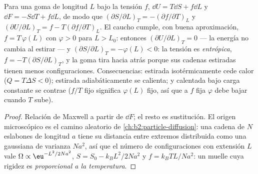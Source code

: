 \begin{proposition}\label{prop:b2:thermodynamic-potentials:rubber}
Para una goma de longitud $L$ bajo la tensión $f$, $\dd U = T\dd S + f\dd L$
y $\dd F = -S\dd T + f\dd L$, de modo que $(\partial S/\partial L)_T =
-(\partial f/\partial T)_L$ y $(\partial U/\partial L)_T = f - T(\partial f/
\partial T)_L$. El caucho cumple, con buena aproximación, $f = T\,\varphi(L)$
con $\varphi > 0$ para $L > L_0$: entonces $(\partial U/\partial L)_T = 0$ --- la
energía no cambia al estirar --- y $(\partial S/\partial L)_T =
-\varphi(L) < 0$: la tensión es \emph{entrópica}, $f = -T(\partial S/\partial
L)_T$, y la goma tira hacia atrás porque sus cadenas estiradas tienen menos
configuraciones. Consecuencias: estirada isotérmicamente cede calor
($Q = T\Delta S < 0$); estirada adiabáticamente se calienta; y calentada bajo
carga constante se contrae ($f/T$ fijo significa $\varphi(L)$ fijo, así que a
$f$ fija $\varphi$ debe bajar cuando $T$ sube).
\end{proposition}

\begin{proof}
Relación de Maxwell a partir de $\dd F$; el resto es sustitución. El
origen microscópico es el camino aleatorio de \cref{ch:b2:particle-diffusion}:
una cadena de $N$ eslabones de longitud $a$ tiene su distancia entre extremos
distribuida como una gaussiana de varianza $Na^2$, así que el número de
configuraciones con extensión $L$ vale $\Omega \propto \eu^{-L^2/2Na^2}$, $S = S_0 -
k_BL^2/2Na^2$ y $f = k_BTL/Na^2$: un muelle cuya rigidez es
\emph{proporcional a la temperatura}.
\end{proof}


